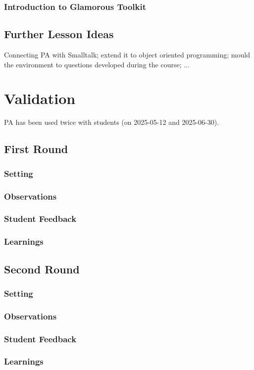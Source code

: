 \subsection{Introduction to Glamorous Toolkit} \label{ssc_lesson_gt}

\section{Further Lesson Ideas} \label{sc_lesson_other}
Connecting PA with Smalltalk; extend it to object oriented programming; mould the environment to questions developed during the course; ...

\chapter{Validation} \label{ch_practice}
PA has been used twice with students (on 2025-05-12 and 2025-06-30).

\section{First Round}
\subsection{Setting}
\subsection{Observations}
\subsection{Student Feedback}
\subsection{Learnings}

\section{Second Round}
\subsection{Setting}
\subsection{Observations}
\subsection{Student Feedback}
\subsection{Learnings}

